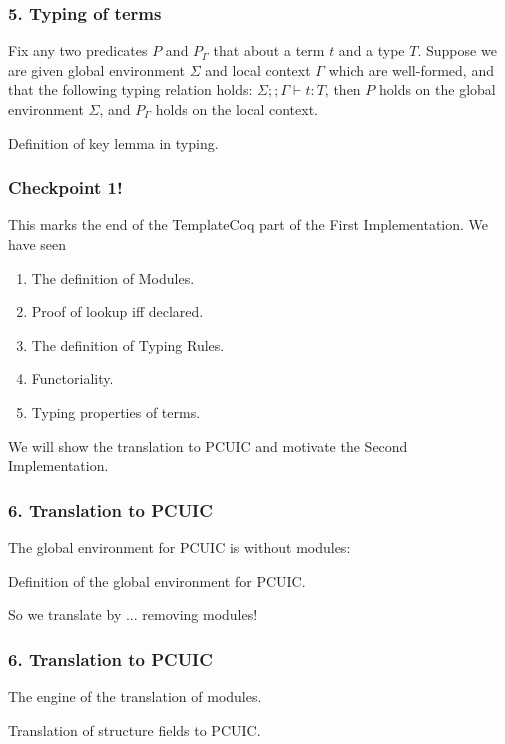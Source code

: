 \begin{frame}
  \frametitle{5. Typing of terms}
  \begin{theorem}
    Fix any two predicates $P$ and $P_\Gamma$ that about a term $t$ and
    a type $T$. Suppose we are given global environment $\Sigma$ and local
    context $\Gamma$ which are well-formed, and that the following typing
    relation holds: $\Sigma ;; \Gamma \vdash t:T$, then $P$ holds on the
    global environment $\Sigma$, and $P_\Gamma$ holds on the local context. 
  \end{theorem}
  \begin{listing}[H]
    \caption{Definition of key lemma in typing.}
  \end{listing} 
\end{frame}

\begin{frame}
  \frametitle{Checkpoint 1!}

  This marks the end of the TemplateCoq part of the First Implementation.
  We have seen
  \begin{enumerate}
  \item The definition of Modules.
  \item Proof of lookup iff declared.
  \item The definition of Typing Rules.
  \item Functoriality.
  \item Typing properties of terms.
  \end{enumerate}

  We will show the translation to PCUIC and motivate the Second Implementation.

\end{frame}

\begin{frame}
  \frametitle{6. Translation to PCUIC}
  The global environment for PCUIC is without modules:

  \begin{listing}[H]
    \caption{Definition of the global environment for PCUIC.}
  \end{listing}
  
  So we translate by ... removing modules!
\end{frame}

\begin{frame}
  \frametitle{6. Translation to PCUIC}
  The engine of the translation of modules.
  \begin{listing}[H]
    \caption{Translation of structure fields to PCUIC.}
  \end{listing}
\end{frame}

